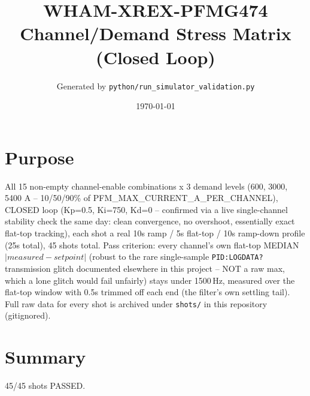 \documentclass[11pt]{article}
\title{WHAM-XREX-PFMG474 Channel/Demand Stress Matrix (Closed Loop)}
\author{Generated by \texttt{python/run\_simulator\_validation.py}}
\date{\today}
\newcommand{\code}[1]{\texttt{#1}}
\newcommand{\cmd}[1]{\texttt{#1}}
\begin{document}
\maketitle

\section*{Purpose}
All 15 non-empty channel-enable combinations x 3 demand levels (600, 3000, 5400 A -- 10/50/90\% of PFM\_MAX\_CURRENT\_A\_PER\_CHANNEL), CLOSED loop (Kp=0.5, Ki=750, Kd=0 -- confirmed via a live single-channel stability check the same day: clean convergence, no overshoot, essentially exact flat-top tracking), each shot a real 10s ramp / 5s flat-top / 10s ramp-down profile (25s total), 45 shots total. Pass criterion: every channel's own flat-top MEDIAN $|\mathit{measured}-\mathit{setpoint}|$ (robust to the rare single-sample \cmd{PID:LOGDATA?} transmission glitch documented elsewhere in this project -- NOT a raw max, which a lone glitch would fail unfairly) stays under 1500\,Hz, measured over the flat-top window with 0.5s trimmed off each end (the filter's own settling tail). Full raw data for every shot is archived under \code{shots/} in this repository (gitignored).

\section*{Summary}
45/45 shots PASSED.
\end{document}
